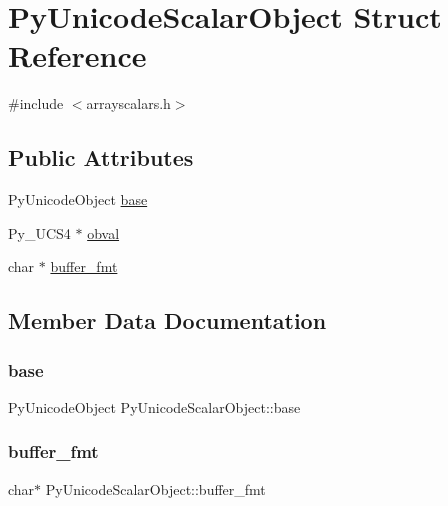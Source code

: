 \hypertarget{structPyUnicodeScalarObject}{}\section{Py\+Unicode\+Scalar\+Object Struct Reference}
\label{structPyUnicodeScalarObject}


{\ttfamily \#include $<$arrayscalars.\+h$>$}

\subsection*{Public Attributes}
\begin{DoxyCompactItemize}
\item 
Py\+Unicode\+Object \hyperlink{structPyUnicodeScalarObject_a93140abcf981ac659e121983a5cf08d8}{base}
\item 
Py\+\_\+\+U\+C\+S4 $\ast$ \hyperlink{structPyUnicodeScalarObject_a7d420a7a2c357b6313ec47b4f29af53d}{obval}
\item 
char $\ast$ \hyperlink{structPyUnicodeScalarObject_a4861b16722a8bd165905f9fcd18be51d}{buffer\+\_\+fmt}
\end{DoxyCompactItemize}


\subsection{Member Data Documentation}
\mbox{\label{structPyUnicodeScalarObject_a93140abcf981ac659e121983a5cf08d8}} 
\subsubsection{\texorpdfstring{base}{base}}
{\footnotesize\ttfamily Py\+Unicode\+Object Py\+Unicode\+Scalar\+Object\+::base}

\mbox{\label{structPyUnicodeScalarObject_a4861b16722a8bd165905f9fcd18be51d}} 
\subsubsection{\texorpdfstring{buffer\+\_\+fmt}{buffer\_fmt}}
{\footnotesize\ttfamily char$\ast$ Py\+Unicode\+Scalar\+Object\+::buffer\+\_\+fmt}

